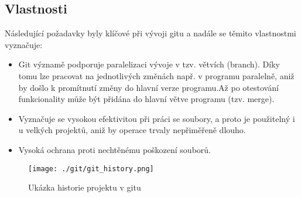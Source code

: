\documentclass[main.tex]{subfiles}
\begin{document}


\subsection{Vlastnosti}
Následující požadavky byly klíčové při vývoji gitu a nadále se těmito vlastnostmi vyznačuje:
\begin{itemize}
\item Git významě podporuje paralelizaci vývoje v tzv. větvích (branch). Díky tomu lze pracovat na jednotlivých změnách např. v programu paralelně, aniž by došlo k promítnutí změny do hlavní verze programu.Až po otestování funkcionality může být přidána do hlavní větve programu (tzv. merge). 

\item Vyznačuje se vysokou efektivitou při práci se soubory, a proto je použitelný i u velkých projektů, aniž by operace trvaly nepřiměřeně dlouho.

\item Vysoká ochrana proti nechtěnému poškození souborů.

\end{itemize}


		\begin{figure}[h]
			\centering
			\texttt{[image: ./git/git\_history.png]}
			\caption{Ukázka historie projektu v gitu}
		\end{figure}


\end{document}
